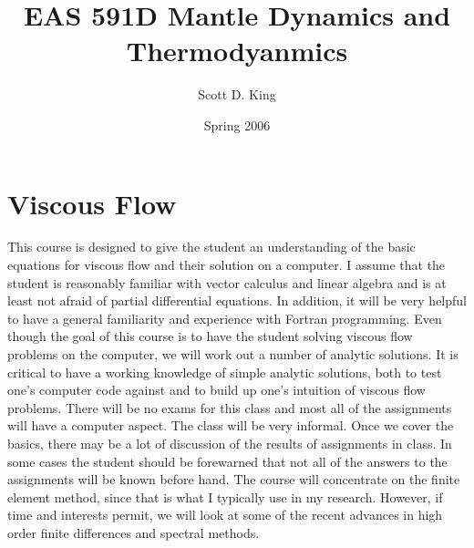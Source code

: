 \documentclass[12pt,twoside]{article}
\begin{document}
\title{EAS 591D Mantle Dynamics and Thermodyanmics}
\author{Scott D. King}
\date{Spring 2006}
\maketitle

\newcommand{\dx}{\delta x}
\newcommand{\dz}{\delta z}
\newcommand{\uxz}{u \left ( x , z \right )}
\newcommand{\Uxz}{\vec u \left ( x , z \right )}
\newcommand{\vxz}{v \left ( x , z \right )}
\newcommand{\uxpz}{u \left ( x + \dx , z \right )}
\newcommand{\vxzp}{v \left ( x , z + \dz \right )}
\newcommand{\rxz}{\rho \left ( x , z \right )}
\newcommand{\rxpz}{\rho \left ( x + \dx , z \right )}
\newcommand{\rxzp}{\rho \left ( x , z + \dz \right )}
\newcommand{\drdt}{{{\partial \rxz}\over{\partial t}}}
\newcommand{\dudx}{{{\partial \uxz}\over{\partial x}}}
\newcommand{\dvdz}{{{\partial \vxz}\over{\partial z}}}
\newcommand{\drdx}{{{\partial \rxz}\over{\partial x}}}
\newcommand{\drdz}{{{\partial \rxz}\over{\partial z}}}

\section{Viscous Flow}
\pagestyle{myheadings}

This course is designed to give the student an understanding of the
basic equations for viscous flow and their solution on a computer.   I assume
that the student is reasonably familiar with vector calculus and linear algebra
and is at least not afraid of partial differential equations.  In addition, it
will be very helpful to have a general familiarity and experience with Fortran
programming.  Even though the goal of this course is to have the student solving
viscous flow problems on the computer, we will work out a number of analytic
solutions.  It is critical to have a working knowledge of simple analytic
solutions, both to test one's computer code against and to build up one's
intuition of viscous flow problems.  There will be no exams for this class and
most all of the assignments will have a computer aspect.   The class will be very
informal.  Once we cover the basics, there may be a lot of discussion of the
results of assignments in class.  In some cases the student should be forewarned
that not all of the answers to the assignments will be known before hand. The
course will concentrate on the finite element method, since that is what I
typically use in my research.   However, if time and interests permit, we will
look at some of the recent advances in high order finite differences and
spectral methods.
\end{document}
